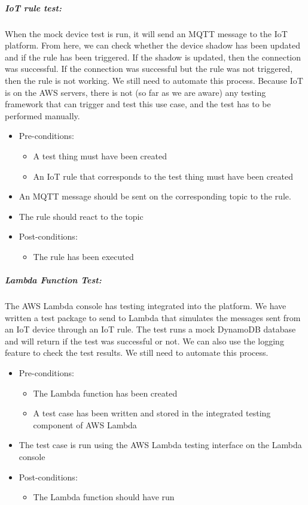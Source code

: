 \documentclass{article}
\begin{document}
	\subparagraph{IoT rule test:}
	When the mock device test is run, it will send an MQTT message to the IoT platform. From here, we can check whether the device shadow has been updated and if the rule has been triggered. If the shadow is updated, then the connection was successful. If the connection was successful but the rule was not triggered, then the rule is not working. We still need to automate this process. Because IoT is on the AWS servers, there is not (so far as we are aware) any testing framework that can trigger and test this use case, and the test has to be performed manually.
	\begin{itemize}
		\item Pre-conditions:
		\begin{itemize}
			\item A test thing must have been created
			\item An IoT rule that corresponds to the test thing must have been created
		\end{itemize}
		\item An MQTT message should be sent on the corresponding topic to the rule.
		\item The rule should react to the topic
		\item Post-conditions:
		\begin{itemize}
			\item The rule has been executed
		\end{itemize}
	\end{itemize}
	
	\subparagraph{Lambda Function Test:}
	The AWS Lambda console has testing integrated into the platform. We have written a test package to send to Lambda that simulates the messages sent from an IoT device through an IoT rule. The test runs a mock DynamoDB database and will return if the test was successful or not. We can also use the logging feature to check the test results. We still need to automate this process.
	\begin{itemize}
		\item Pre-conditions:
		\begin{itemize}
			\item The Lambda function has been created
			\item A test case has been written and stored in the integrated testing component of AWS Lambda
		\end{itemize}
		\item The test case is run using the AWS Lambda testing interface on the Lambda console
		\item Post-conditions:
		\begin{itemize}
			\item The Lambda function should have run
		\end{itemize}
	\end{itemize}
	
\end{document}
